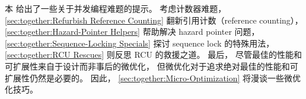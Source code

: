 
%


本
给出了一些关于并发编程难题的提示。
考虑计数器难题，
\cref{sec:together:Refurbish Reference Counting}
翻新引用计数（reference counting），
\cref{sec:together:Hazard-Pointer Helpers}
帮助解决 hazard pointer 问题，
\cref{sec:together:Sequence-Locking Specials}
探讨 sequence lock 的特殊用法，
\cref{sec:together:RCU Rescues}
则反思 RCU 的救援之道。
最后，
尽管最佳的性能和可扩展性来自于设计而非事后的微优化，
但微优化对于追求绝对最佳的性能和可扩展性仍然是必要的。
因此，
\cref{sec:together:Micro-Optimization}
将漫谈一些微优化技巧。








